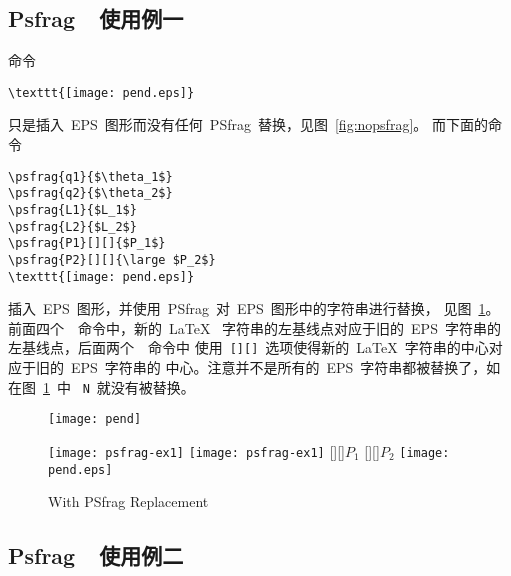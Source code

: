 \subsection{Psfrag~~使用例一}\label{ssec:psfragex1}

命令
\begin{Verbatim}[xleftmargin=1cm]
\texttt{[image: pend.eps]}
\end{Verbatim}
只是插入~EPS~图形而没有任何~\textsf{PSfrag}~替换，见图~\ref{fig:nopsfrag}。
而下面的命令
\begin{Verbatim}[xleftmargin=1cm]
\psfrag{q1}{$\theta_1$}
\psfrag{q2}{$\theta_2$}
\psfrag{L1}{$L_1$}
\psfrag{L2}{$L_2$}
\psfrag{P1}[][]{$P_1$}
\psfrag{P2}[][]{\large $P_2$}
\texttt{[image: pend.eps]}
\end{Verbatim}
插入~EPS~图形，并使用~\textsf{PSfrag}~对~EPS~图形中的字符串进行替换，
见图~\ref{fig:psfragex1}。前面四个~~命令中，新的~\LaTeX{}~
字符串的左基线点对应于旧的~EPS~字符串的左基线点，后面两个~~命令中
使用~\texttt{[][]}~选项使得新的~\LaTeX{}~字符串的中心对应于旧的~EPS~字符串的
中心。注意并不是所有的~EPS~字符串都被替换了，如在图~\ref{fig:psfragex1}~中
~\texttt{N}~就没有被替换。

\begin{figure}
\hspace{-1.5cm}
\begin{minipage}[t]{.7\textwidth}
\vspace{0pt}
\centering
\texttt{[image: pend]}
\caption{Without PSfrag Replacement}\label{fig:nopsfrag}
\end{minipage}%
\hspace{-3cm}
\begin{minipage}[t]{.7\textwidth}
\vspace{0pt}
\ifpdf
\centering
\texttt{[image: psfrag-ex1]}
\else
\ifdvipdfm
\centering
\texttt{[image: psfrag-ex1]}
\else
{}
[][]{$P_1$}
[][]{\large $P_2$}
\centering
\texttt{[image: pend.eps]}
\fi
\fi
\caption{With PSfrag Replacement}\label{fig:psfragex1}
\end{minipage}
\end{figure}

\subsection{Psfrag~~使用例二}\label{ssec:psfragex2}

